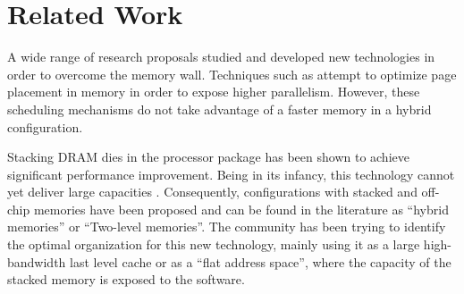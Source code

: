 
\section{Related Work}
\label{sec:Background}

A wide range of research proposals studied and developed new technologies in order to overcome the memory wall. 
Techniques such as \cite{BUMP,RMM,SUPERPAGES} attempt to optimize page placement in memory in order to expose higher parallelism. However, these scheduling mechanisms do not take advantage of a faster memory in a hybrid configuration.

Stacking DRAM dies in the processor package has been shown to achieve significant performance improvement. Being in its infancy, this technology cannot yet deliver large capacities \cite{JEDEC-HBM-REVISED}. Consequently, configurations with stacked and off-chip memories have been proposed \cite{LOH-HYBRID,qureshi-micro2012} and can be found in the literature as ``hybrid memories'' or ``Two-level memories''. The community has been trying to identify the optimal organization for this new technology, mainly using it as a large high-bandwidth last level cache or as a ``flat address space'', where the capacity of the stacked memory is exposed to the software.

